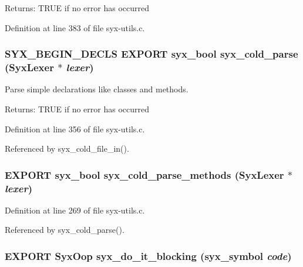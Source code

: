 \begin{Desc}
\item[Returns:]TRUE if no error has occurred \end{Desc}


Definition at line 383 of file syx-utils.c.\hypertarget{syx-utils_8h_64a1dbecdc9c844cd8e09dba2b7adf6d}{
\subsubsection{\setlength{\rightskip}{0pt plus 5cm}SYX\_\-BEGIN\_\-DECLS EXPORT {\bf syx\_\-bool} syx\_\-cold\_\-parse ({\bf SyxLexer} $\ast$ {\em lexer})}}
\label{syx-utils_8h_64a1dbecdc9c844cd8e09dba2b7adf6d}


Parse simple declarations like classes and methods.

\begin{Desc}
\item[Returns:]TRUE if no error has occurred \end{Desc}


Definition at line 356 of file syx-utils.c.

Referenced by syx\_\-cold\_\-file\_\-in().\hypertarget{syx-utils_8h_a7c09f55d7e8a1e33a4f40b6e3644995}{
\subsubsection{\setlength{\rightskip}{0pt plus 5cm}EXPORT {\bf syx\_\-bool} syx\_\-cold\_\-parse\_\-methods ({\bf SyxLexer} $\ast$ {\em lexer})}}
\label{syx-utils_8h_a7c09f55d7e8a1e33a4f40b6e3644995}




Definition at line 269 of file syx-utils.c.

Referenced by syx\_\-cold\_\-parse().\hypertarget{syx-utils_8h_c6b5dd77f43dc814af8ac022d9cd81d7}{
\subsubsection{\setlength{\rightskip}{0pt plus 5cm}EXPORT {\bf SyxOop} syx\_\-do\_\-it\_\-blocking ({\bf syx\_\-symbol} {\em code})}}
\label{syx-utils_8h_c6b5dd77f43dc814af8ac022d9cd81d7}


